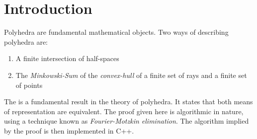 \chapter*{Introduction}

Polyhedra are fundamental mathematical objects.  Two ways of describing polyhedra are:
\begin{enumerate}
  \item A finite intersection of half-spaces
  \item The \textit{Minkowski-Sum} of the \textit{convex-hull} of a finite set of rays and a finite set of points
\end{enumerate}
The \MWT is a fundamental result in the theory of polyhedra.  It states that both means of representation are equivalent.  The proof given here is algorithmic in nature, using a technique known as \textit{Fourier-Motzkin elimination}.  The algorithm implied by the proof is then implemented in C++.
